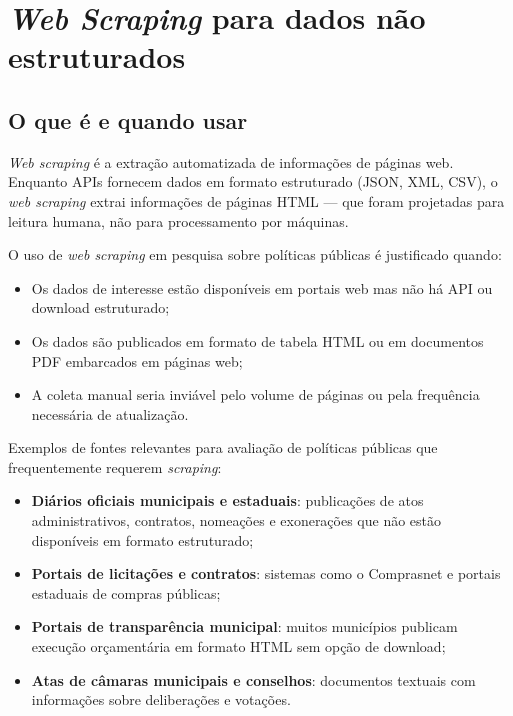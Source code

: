 \section{\textit{Web Scraping} para dados não estruturados}

\subsection{O que é e quando usar}

\textit{Web scraping} é a extração automatizada de informações de páginas web. Enquanto APIs fornecem dados em formato estruturado (JSON, XML, CSV), o \textit{web scraping} extrai informações de páginas HTML --- que foram projetadas para leitura humana, não para processamento por máquinas.

O uso de \textit{web scraping} em pesquisa sobre políticas públicas é justificado quando:

\begin{itemize}
  \item Os dados de interesse estão disponíveis em portais web mas não há API ou download estruturado;
  \item Os dados são publicados em formato de tabela HTML ou em documentos PDF embarcados em páginas web;
  \item A coleta manual seria inviável pelo volume de páginas ou pela frequência necessária de atualização.
\end{itemize}

Exemplos de fontes relevantes para avaliação de políticas públicas que frequentemente requerem \textit{scraping}:

\begin{itemize}
  \item \textbf{Diários oficiais municipais e estaduais}: publicações de atos administrativos, contratos, nomeações e exonerações que não estão disponíveis em formato estruturado;
  \item \textbf{Portais de licitações e contratos}: sistemas como o Comprasnet e portais estaduais de compras públicas;
  \item \textbf{Portais de transparência municipal}: muitos municípios publicam execução orçamentária em formato HTML sem opção de download;
  \item \textbf{Atas de câmaras municipais e conselhos}: documentos textuais com informações sobre deliberações e votações.
\end{itemize}

